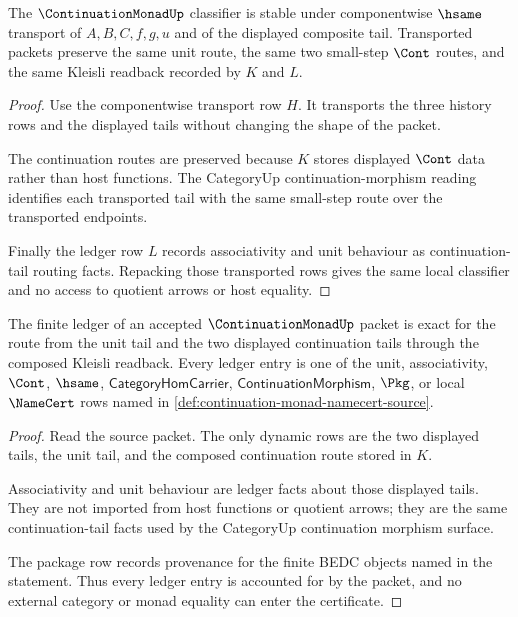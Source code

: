\begin{theorem}
\label{thm:continuation-monad-classifier-stability}
The $\ContinuationMonadUp$ classifier is stable under componentwise $\hsame$ transport of $A,B,C,f,g,u$ and of the displayed composite tail. Transported packets preserve the same unit route, the same two small-step $\Cont$ routes, and the same Kleisli readback recorded by $K$ and $L$.
\end{theorem}
\begin{proof}
Use the componentwise transport row $H$. It transports the three history rows and the displayed tails without changing the shape of the packet.

The continuation routes are preserved because $K$ stores displayed $\Cont$ data rather than host functions. The CategoryUp continuation-morphism reading identifies each transported tail with the same small-step route over the transported endpoints.

Finally the ledger row $L$ records associativity and unit behaviour as continuation-tail routing facts. Repacking those transported rows gives the same local classifier and no access to quotient arrows or host equality.
\end{proof}

\begin{theorem}
\label{thm:continuation-monad-ledger-exactness}
The finite ledger of an accepted $\ContinuationMonadUp$ packet is exact for the route from the unit tail and the two displayed continuation tails through the composed Kleisli readback. Every ledger entry is one of the unit, associativity, $\Cont$, $\hsame$, $\mathsf{CategoryHomCarrier}$, $\mathsf{ContinuationMorphism}$, $\Pkg$, or local $\NameCert$ rows named in \autoref{def:continuation-monad-namecert-source}.
\end{theorem}
\begin{proof}
Read the source packet. The only dynamic rows are the two displayed tails, the unit tail, and the composed continuation route stored in $K$.

Associativity and unit behaviour are ledger facts about those displayed tails. They are not imported from host functions or quotient arrows; they are the same continuation-tail facts used by the CategoryUp continuation morphism surface.

The package row records provenance for the finite BEDC objects named in the statement. Thus every ledger entry is accounted for by the packet, and no external category or monad equality can enter the certificate.
\end{proof}

